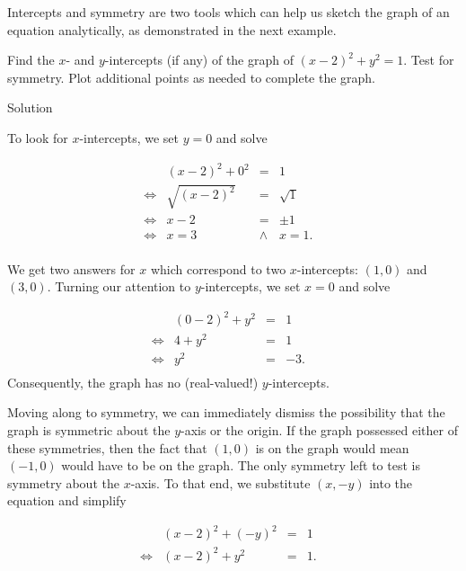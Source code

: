 \ifcalculus
Intercepts and symmetry are two tools which can help us sketch the graph of an equation analytically, as demonstrated in the next example.


\begin{example}
	Find the $x$- and $y$-intercepts (if any) of the graph of $(x-2)^2 + y^2 = 1$. Test for symmetry.  Plot additional points as needed to complete the graph.
	
	Solution 
	
	To look for $x$-intercepts, we set $y=0$ and solve
	
	\[ \begin{array}{rrclr}   
	
	&(x-2)^2 + 0^2 & = & 1 & \\ 
	\Leftrightarrow &\sqrt{(x-2)^2} & = & \sqrt{1} & \\
	\Leftrightarrow &x - 2 & = & \pm 1 & \\
	\Leftrightarrow &x  = 3 & \wedge & x  =  1. & \\
	
	\end{array} \]
	
	We get two answers for $x$ which correspond to two $x$-intercepts:  $(1,0)$ and $(3,0)$.    Turning our attention to $y$-intercepts, we set $x=0$ and solve
	
	\[ \begin{array}{rrclr}   
	
	&(0-2)^2 + y^2 & = & 1 & \\ 
	\Leftrightarrow&4 + y^2 & = & 1 & \\
	\Leftrightarrow&y^2 & = & -3. & \\
	
	\end{array} \]
	Consequently, the graph has no (real-valued!) $y$-intercepts.
	
	
	Moving along to symmetry, we can immediately dismiss the possibility that the graph is symmetric about the $y$-axis or the origin.  If the graph possessed either of these symmetries, then the fact that $(1,0)$ is on the graph would mean $(-1,0)$ would have to be on the graph. The only symmetry left to test is symmetry about the $x$-axis.   To that end, we substitute $(x,-y)$ into the equation and simplify
	
	\[ \begin{array}{rrclr}   
	&(x-2)^2 + (-y)^2 & = & 1 & \\ 
	\Leftrightarrow&(x-2)^2 + y^2 & = & 1 .& \\
	\end{array} \]
	

\end{example}
